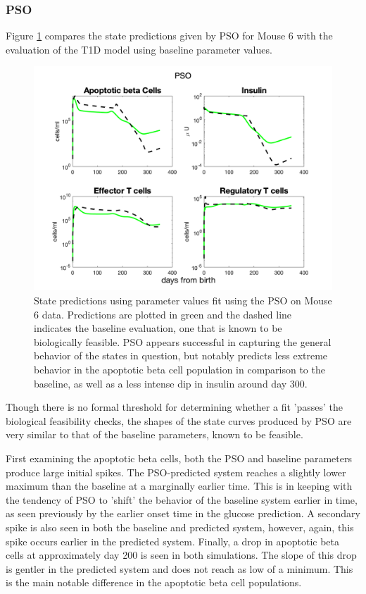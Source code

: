 \subsubsection{PSO}
Figure \ref{fig:PSO_biocheck} compares the state predictions given by PSO for Mouse 6 with the evaluation of the T1D model using baseline parameter values.
\begin{figure}[H] 
    \centering
    \includegraphics[width=15cm]{Final_Paper_Pieces/PSO_figs/PSO_biocheck.png}
    \caption{State predictions using parameter values fit using the PSO on Mouse 6 data. Predictions are plotted in green and the dashed line indicates the baseline evaluation, one that is known to be biologically feasible. PSO appears successful in capturing the general behavior of the states in question, but notably predicts less extreme behavior in the apoptotic beta cell population in comparison to the baseline, as well as a less intense dip in insulin around day 300.}
    \label{fig:PSO_biocheck}
\end{figure}
Though there is no formal threshold for determining whether a fit 'passes' the biological feasibility checks, the shapes of the state curves produced by PSO are very similar to that of the baseline parameters, known to be feasible.
\par First examining the apoptotic beta cells, both the PSO and baseline parameters produce large initial spikes. The PSO-predicted system reaches a slightly lower maximum than the baseline at a marginally earlier time. This is in keeping with the tendency of PSO to 'shift' the behavior of the baseline system earlier in time, as seen previously by the earlier onset time in the glucose prediction. A secondary spike is also seen in both the baseline and predicted system, however, again, this spike occurs earlier in the predicted system. Finally, a drop in apoptotic beta cells at approximately day 200 is seen in both simulations. The slope of this drop is gentler in the predicted system and does not reach as low of a minimum. This is the main notable difference in the apoptotic beta cell populations. 
